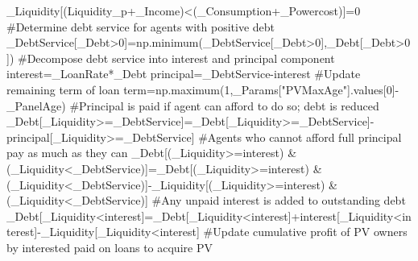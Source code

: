 \documentclass[
  letterpaper,
  DIV=11,
  numbers=noendperiod]{scrartcl}
\newenvironment{Shaded}{\begin{snugshade}}{\end{snugshade}}
\newcommand{\CommentTok}[1]{\textcolor[rgb]{0.37,0.37,0.37}{#1}}
\newcommand{\DecValTok}[1]{\textcolor[rgb]{0.68,0.00,0.00}{#1}}
\newcommand{\NormalTok}[1]{\textcolor[rgb]{0.00,0.23,0.31}{#1}}
\newcommand{\OperatorTok}[1]{\textcolor[rgb]{0.37,0.37,0.37}{#1}}
\newcommand{\StringTok}[1]{\textcolor[rgb]{0.13,0.47,0.30}{#1}}
\begin{document}
\begin{Shaded}
\begin{Highlighting}[]
\NormalTok{    \_Liquidity[(Liquidity\_p}\OperatorTok{+}\NormalTok{\_Income)}\OperatorTok{\textless{}}\NormalTok{(\_Consumption}\OperatorTok{+}\NormalTok{\_Powercost)]}\OperatorTok{=}\DecValTok{0}
    \CommentTok{\#Determine debt service for agents with positive debt}
\NormalTok{    \_DebtService[\_Debt}\OperatorTok{\textgreater{}}\DecValTok{0}\NormalTok{]}\OperatorTok{=}\NormalTok{np.minimum(\_DebtService[\_Debt}\OperatorTok{\textgreater{}}\DecValTok{0}\NormalTok{],\_Debt[\_Debt}\OperatorTok{\textgreater{}}\DecValTok{0}\NormalTok{])}
    \CommentTok{\#Decompose debt service into interest and principal component}
\NormalTok{    interest}\OperatorTok{=}\NormalTok{\_LoanRate}\OperatorTok{*}\NormalTok{\_Debt}
\NormalTok{    principal}\OperatorTok{=}\NormalTok{\_DebtService}\OperatorTok{{-}}\NormalTok{interest}
    \CommentTok{\#Update remaining term of loan}
\NormalTok{    term}\OperatorTok{=}\NormalTok{np.maximum(}\DecValTok{1}\NormalTok{,\_Params[}\StringTok{"PVMaxAge"}\NormalTok{].values[}\DecValTok{0}\NormalTok{]}\OperatorTok{{-}}\NormalTok{\_PanelAge)}
    \CommentTok{\#Principal is paid if agent can afford to do so; debt is reduced}
\NormalTok{    \_Debt[\_Liquidity}\OperatorTok{\textgreater{}=}\NormalTok{\_DebtService]}\OperatorTok{=}\NormalTok{\_Debt[\_Liquidity}\OperatorTok{\textgreater{}=}\NormalTok{\_DebtService]}\OperatorTok{{-}}\NormalTok{principal[\_Liquidity}\OperatorTok{\textgreater{}=}\NormalTok{\_DebtService]}
    \CommentTok{\#Agents who cannot afford full principal pay as much as they can}
\NormalTok{    \_Debt[(\_Liquidity}\OperatorTok{\textgreater{}=}\NormalTok{interest) }\OperatorTok{\&}\NormalTok{ (\_Liquidity}\OperatorTok{\textless{}}\NormalTok{\_DebtService)]}\OperatorTok{=}\NormalTok{\_Debt[(\_Liquidity}\OperatorTok{\textgreater{}=}\NormalTok{interest) }\OperatorTok{\&}\NormalTok{ (\_Liquidity}\OperatorTok{\textless{}}\NormalTok{\_DebtService)]}\OperatorTok{{-}}\NormalTok{\_Liquidity[(\_Liquidity}\OperatorTok{\textgreater{}=}\NormalTok{interest) }\OperatorTok{\&}\NormalTok{ (\_Liquidity}\OperatorTok{\textless{}}\NormalTok{\_DebtService)]}
    \CommentTok{\#Any unpaid interest is added to outstanding debt}
\NormalTok{    \_Debt[\_Liquidity}\OperatorTok{\textless{}}\NormalTok{interest]}\OperatorTok{=}\NormalTok{\_Debt[\_Liquidity}\OperatorTok{\textless{}}\NormalTok{interest]}\OperatorTok{+}\NormalTok{interest[\_Liquidity}\OperatorTok{\textless{}}\NormalTok{interest]}\OperatorTok{{-}}\NormalTok{\_Liquidity[\_Liquidity}\OperatorTok{\textless{}}\NormalTok{interest]}
    \CommentTok{\#Update cumulative profit of PV owners by interested paid on loans to acquire PV}

\end{Highlighting}
\end{Shaded}
\end{document}
